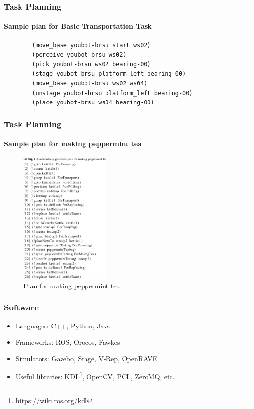 \documentclass{beamer}
\begin{document}
\begin{frame}[fragile]
\frametitle{Task Planning}
\framesubtitle{Sample plan for Basic Transportation Task}
    \begin{verbatim}
        (move_base youbot-brsu start ws02)
        (perceive youbot-brsu ws02)
        (pick youbot-brsu ws02 bearing-00)
        (stage youbot-brsu platform_left bearing-00)
        (move_base youbot-brsu ws02 ws04)
        (unstage youbot-brsu platform_left bearing-00)
        (place youbot-brsu ws04 bearing-00)
    \end{verbatim}
\end{frame}

\begin{frame}
\frametitle{Task Planning}
\framesubtitle{Sample plan for making peppermint tea}
\begin{figure}[H]
     \centering
     \includegraphics[width=0.4\textwidth]{images/bring_me_tea.png}
     \caption{Plan for making peppermint tea~\cite{Awaad}}
     \label{fig:tea}
\end{figure}
\end{frame}

\begin{frame}
\frametitle{Software}
\begin{itemize}
    \item <1->Languages: C++, Python, Java
    \item <2->Frameworks: ROS, Orocos, Fawkes
    \item <3->Simulators: Gazebo, Stage, V-Rep, OpenRAVE
    \item <4->Useful libraries: KDL\footnote{https://wiki.ros.org/kdl}, OpenCV, PCL, ZeroMQ, etc.
\end{itemize}
\end{frame}
\end{document}
